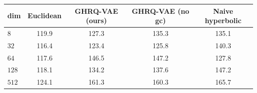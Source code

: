 \begin{tabular}{lcccc}
\hline
dim & Euclidean & GHRQ-VAE (ours) & GHRQ-VAE (no gc) & Naive hyperbolic \\
\hline
$8$ & 119.9 & 127.3 & 135.3 & 135.1 \\
$32$ & 116.4 & 123.4 & 125.8 & 140.3 \\
$64$ & 117.6 & 146.5 & 147.2 & 127.8 \\
$128$ & 118.1 & 134.2 & 137.6 & 147.2 \\
$512$ & 124.1 & 161.3 & 160.3 & 165.7 \\
\hline
\end{tabular}
